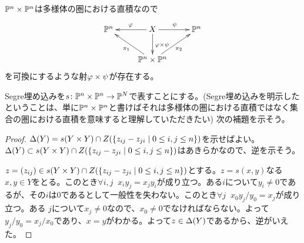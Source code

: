 

\begin{rem}
  ${\mathbb P}^n \times {\mathbb P}^n$は多様体の圏における直積なので
  \[
  \xymatrix{
  \P^n & X \ar[r]^{\psi} \ar[l]_{\vp} \ar[d]^{\vp \tm \psi} & \P^n \\
  {} & \P^n \tm \P^n \ar[ul]^{\pi_1} \ar[ur]_{\pi_2} & {}
  }
  \]
  を可換にするような射${\varphi} \times \psi$が存在する。
\end{rem}



\begin{rem}
  Segre埋め込みを$s \colon {\mathbb P}^n \times {\mathbb P}^n \to {\mathbb P}^N$で表すことにする。(Segre埋め込みを明示したということは、単に${\mathbb P}^n \times {\mathbb P}^n$と書けばそれは多様体の圏における直積ではなく集合の圏における直積を意味すると理解していただきたい) 次の補題を示そう。
\end{rem}

\begin{proof}
${\Delta}(Y) = s(Y \times Y) \cap Z(\left\{ z_{ij} - z_{ji}  \mathrel{} \middle| \mathrel{} 0 \leq i,j \leq n \right\})$を示せばよい。${\Delta}(Y) \subset s(Y \times Y) \cap Z(\left\{ z_{ij} - z_{ji}  \mathrel{} \middle| \mathrel{} 0 \leq i,j \leq n \right\})$はあきらかなので、逆を示そう。

$z=(z_{ij}) \in s(Y \times Y) \cap Z(\left\{ z_{ij} - z_{ji}  \mathrel{} \middle| \mathrel{} 0 \leq i,j \leq n \right\})$とする。$z = s(x,y)$なる$x,y \in Y$をとる。このとき$\forall i,j \; \; x_i y_j = x_j y_i$が成り立つ。ある$i$について$y_i \neq 0$であるが、その$i$は$0$であるとして一般性を失わない。このとき$\forall j \; \; x_0 y_j / y_0 = x_j$が成り立つ。ある
$j$について$x_j \neq 0$なので、$x_0 \neq 0$でなければならない。よって$y_j / y_0 = x_j / x_0$であり、$x= y$がわかる。よって$z \in {\Delta}(Y)$であるから、逆がいえた。
\end{proof}




